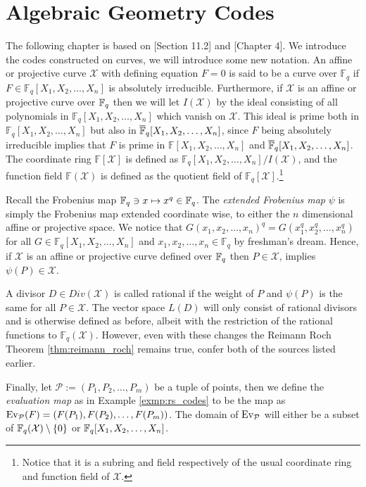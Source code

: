 \chapter{Algebraic Geometry Codes}\label{chap:alg_geom_codes}
The following chapter is based on \cite{CCC_with_CA}[Section 11.2] and \cite{notes_on_alg_geom_codes}[Chapter 4].
We introduce the codes constructed on curves, we will introduce some new notation. An affine or projective curve $\mathcal{X}$ with defining equation $F = 0$ is said to be a curve over $\mathbb{F}_{q}$ if $F \in \mathbb{F}_{q}[X_1, X_2, \ldots, X_{n}]$ is absolutely irreducible. Furthermore, if $\mathcal{X}$ is an affine or projective curve over $\mathbb{F}_{q}$ then we will let $I(\mathcal{X})$ by the ideal consisting of all polynomials in $\mathbb{F}_{q}[X_1, X_2, \ldots, X_{n}]$ which vanish on $\mathcal{X}$. This ideal is prime both in $\mathbb{F}_{q}[X_1, X_2, \ldots, X_{n}]$ but also in $\overline{\mathbb{F}}_{q}[X_1, X_2, \ldots, X_{n}]$, since $F$ being absolutely irreducible implies that $F$ is prime in $\mathbb{F}[X_1, X_2, \ldots, X_{n}]$ and $\overline{\mathbb{F}}_{q}[X_1, X_2, \ldots, X_{n}]$. The coordinate ring $\mathbb{F}[\mathcal{X}]$ is defined as $\mathbb{F}_{q}[X_1, X_2, \ldots, X_{n}] / I(\mathcal{X})$, and the function field $\mathbb{F}(\mathcal{X})$ is defined as the quotient field of $\mathbb{F}_{q}[\mathcal{X}]$.\footnote{Notice that it is a subring and field respectively of the usual coordinate ring and function field of $\mathcal{X}$.}

Recall the Frobenius map $\mathbb{F}_{q} \ni x \mapsto x^{q} \in \mathbb{F}_{q}$. The \textit{extended Frobenius map} $\psi$ is simply the Frobenius map extended coordinate wise, to either the $n$ dimensional affine or projective space. We notice that $G(x_1, x_2, \ldots, x_{n})^{q} = G(x_1^{q}, x_2^{q}, \ldots, x_{n}^{q})$ for all $G \in \mathbb{F}_{q}[X_1, X_2, \ldots, X_{n}]$ and $x_1, x_2, \ldots, x_{n} \in \mathbb{F}_{q}$ by freshman's dream. Hence, if $\mathcal{X}$ is an affine or projective curve defined over $\mathbb{F}_{q}$ then $P \in \mathcal{X}$, implies $\psi(P) \in \mathcal{X}$.

A divisor $D \in Div(\mathcal{X})$ is called rational if the weight of $P$ and $\psi(P)$ is the same for all $P \in \mathcal{X}$. The vector space $L(D)$ will only consist of rational divisors and is otherwise defined as before, albeit with the restriction of the rational functions to $\mathbb{F}_{q}(\mathcal{X})$. However, even with these changes the Reimann Roch Theorem \ref{thm:reimann_roch} remains true, confer both of the sources listed earlier.

Finally, let $\mathcal{P} := (P_1, P_2, \ldots, P_{m})$ be a tuple of points, then we define the \textit{evaluation map} as in Example \ref{exmp:rs_codes} to be the map as $\textnormal{Ev}_\mathcal{P}(F) = (F(P_1), F(P_2), \ldots, F(P_{m}))$. The domain of $\textnormal{Ev}_\mathcal{P}$ will either be a subset of $\mathbb{F}_{q}(\mathcal{X}) \setminus \left\{0\right\}$ or $\mathbb{F}_{q}[X_1, X_2, \ldots, X_{n}]$.
\newpage

\newpage


